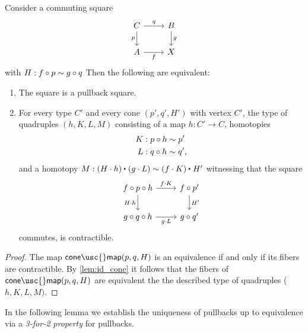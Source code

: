 \begin{lem}\label{thm:pullback_up}
Consider a commuting square
\begin{equation*}
\begin{tikzcd}
C \arrow[r,"q"] \arrow[d,swap,"p"] & B \arrow[d,"g"] \\
A \arrow[r,swap,"f"] & X
\end{tikzcd}
\end{equation*}
with $H:f\circ p\sim g\circ q$
Then the following are equivalent:
\begin{enumerate}
\item The square is a pullback square.
\item For every type $C'$ and every cone $(p',q',H')$ with vertex $C'$, the type of quadruples $(h,K,L,M)$ consisting of a map $h:C'\to C$, homotopies
\begin{align*}
K & : p\circ h \sim p' \\
L & : q\circ h \sim q',
\end{align*}
and a homotopy $M : \ct{(H\cdot h)}{(g\cdot L)} \htpy \ct{(f\cdot K)}{H'}$ witnessing that the square
\begin{equation*}
\begin{tikzcd}
f\circ p\circ h \arrow[r,"f\cdot K"] \arrow[d,swap,"H\cdot h"] & f\circ p' \arrow[d,"{H'}"] \\
g\circ q\circ h \arrow[r,swap,"g\cdot L"] & g\circ q'
\end{tikzcd}
\end{equation*}
commutes, is contractible.
\end{enumerate}
\end{lem}

\begin{proof}
The map $\mathsf{cone\usc{}map}(p,q,H)$ is an equivalence if and only if its fibers are contractible. By \cref{lem:id_cone} it follows that the fibers of $\mathsf{cone\usc{}map}(p,q,H)$ are equivalent the the described type of quadruples ($h,K,L,M)$.
\end{proof}

In the following lemma we establish the uniqueness of pullbacks up to equivalence via a \emph{3-for-2 property} for pullbacks.

